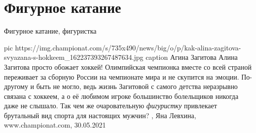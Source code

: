  
 
 
 
 
\chapter{Фигурное катание}

Фигурное катание, фигуристка

\ifcmt
  pic https://img.championat.com/s/735x490/news/big/o/p/kak-alina-zagitova-svyazana-s-hokkeem_162237393267487634.jpg
	caption Агина Загитова
\fi
Алина Загитова просто обожает хоккей! Олимпийская чемпионка вместе со всей
страной переживает за сборную России на чемпионате мира и не скупится на
эмоции. По-другому и быть не могло, ведь жизнь Загитовой с самого детства
неразрывно связана с хоккеем, а о её любимом игроке большинство болельщиков
никогда даже не слышало. Так чем же очаровательную \emph{фигуристку} привлекает
брутальный вид спорта для настоящих мужчин?
, 
Яна Левхина, www.championat.com, 30.05.2021

